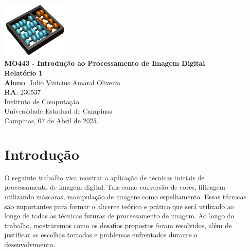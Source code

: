 \documentclass[12pt,a4paper]{report}
\begin{document}
\begin{titlepage}
    \begin{center}
        \vspace*{1cm}
        \includegraphics[width=0.25\textwidth]{imagens/Logo}\\
        \vspace{1.5cm}
        \Huge
    	\textbf{MO443 - Introdução ao Processamento de Imagem Digital}\\
        \vspace{0.5cm}
        \textbf{Relatório 1}\\
        \vspace{0.5cm}
        \Large
        \textbf{Aluno}: Julio Vinicius Amaral Oliveira\\
        \textbf{RA}: 230537\\
        \vspace{1.2cm}
    	\Large 
    	Instituto de Computação\\
    	Universidade Estadual de Campinas\\
    	\vspace{1.5cm}
        Campinas, 07 de Abril de 2025.
    \end{center}
\end{titlepage}
\tableofcontents
\clearpage

\newcommand{\shellcmd}[1]{\texttt{\footnotesize\# #1}}%

\section{Introdução} 
O seguinte trabalho visa mostrar a aplicação de técnicas iniciais de processamento de imagem digital. Tais como conversão de cores, filtragem utilizando máscaras, manipulação de imagens como espelhamento. Essas técnicas são importantes para formar o alicerce teórico e prático que será utilizado ao longo de todas as técnicas futuras de processamento de imagem. Ao longo do trabalho, mostraremos como os desafios propostos foram resolvidos, além de justificar as escolhas tomadas e problemas enfrentados durante o desenvolvimento.
\end{document}
